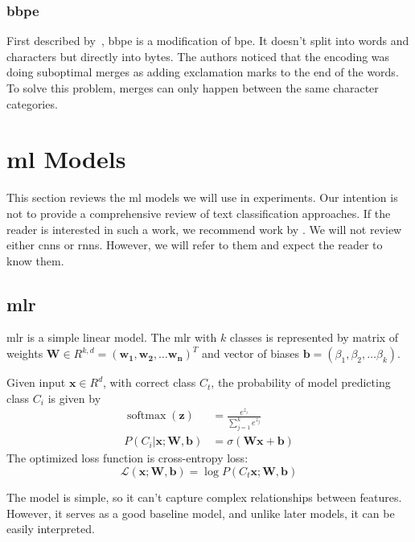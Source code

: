 \subsubsection{\acl{bbpe}}
\label{sec:bbpe}
First described by~\textcite{Radford2019LanguageMA}, \acf{bbpe} is a modification of \ac{bpe}.
It doesn't split into words and characters but directly into bytes.
The authors noticed that the encoding was doing suboptimal merges as adding exclamation marks to the end of the words.
To solve this problem, merges can only happen between the same character categories.

\section{\acl{ml} Models}
\label{sec:models}
This section reviews the \ac{ml} models we will use in experiments.
Our intention is not to provide a comprehensive review of text classification approaches.
If the reader is interested in such a work, we recommend work by \textcite{kowsariTextClassificationAlgorithms2019}.
We will not review either \acp{cnn} or \acp{rnn}.
However, we will refer to them and expect the reader to know them.

\subsection{\acl{mlr}}
\label{sec:mlr}
\acf{mlr} is a simple linear model.
The \ac{mlr} with $k$ classes is represented by matrix of weights $\mathbf{W} \in R^{k, d} = (\mathbf{w_1}, \mathbf{w_2}, \dots \mathbf{w_n})^T$
and vector of biases $\mathbf{b} = (\beta_1, \beta_2, \dots \beta_k)$.

Given input $\mathbf{x} \in R^{d}$, with correct class $C_t$, the probability of model predicting class $C_i$ is given by
\begin{align*}
    \operatorname{softmax}(\mathbf{z})          & = \frac{e^{z_i}}{\sum_{j=1}^{k} e^{z_j}}     \\
    P(C_i | \mathbf{x}; \mathbf{W}, \mathbf{b}) & = \sigma(\mathbf{W} \mathbf{x} + \mathbf{b})
\end{align*}
The optimized loss function is cross-entropy loss:
\begin{equation*}
    \mathcal{L}(\mathbf{x};\mathbf{W}, \mathbf{b}) = \log{P(C_t \mathbf{x}; \mathbf{W}, \mathbf{b})}
\end{equation*}

The model is simple, so it can't capture complex relationships between features.
However, it serves as a good baseline model, and unlike later models, it can be easily interpreted.

